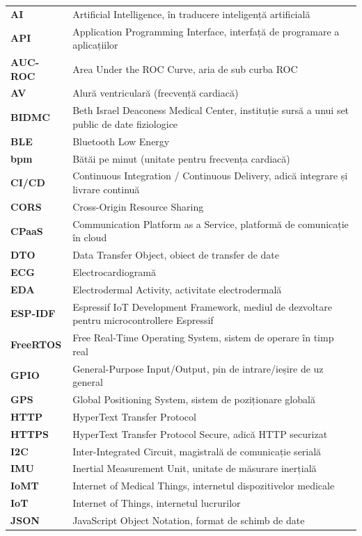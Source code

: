 \documentclass[12pt,a4paper]{article}
\begin{document}
{\small
\renewcommand{\arraystretch}{1.25}
\begin{longtable}{@{}>{\bfseries}p{2.7cm}p{10.6cm}@{}}
AI & Artificial Intelligence, în traducere inteligență artificială\\
API & Application Programming Interface, interfață de programare a aplicațiilor\\
AUC-ROC & Area Under the ROC Curve, aria de sub curba ROC\\
AV & Alură ventriculară (frecvență cardiacă)\\
BIDMC & Beth Israel Deaconess Medical Center, instituție sursă a unui set public de date fiziologice\\
BLE & Bluetooth Low Energy\\
bpm & Bătăi pe minut (unitate pentru frecvența cardiacă)\\
CI/CD & Continuous Integration / Continuous Delivery, adică integrare și livrare continuă\\
CORS & Cross-Origin Resource Sharing\\
CPaaS & Communication Platform as a Service, platformă de comunicație în cloud\\
DTO & Data Transfer Object, obiect de transfer de date\\
ECG & Electrocardiogramă\\
EDA & Electrodermal Activity, activitate electrodermală\\
ESP-IDF & Espressif IoT Development Framework, mediul de dezvoltare pentru microcontrollere Espressif\\
FreeRTOS & Free Real-Time Operating System, sistem de operare în timp real\\
GPIO & General-Purpose Input/Output, pin de intrare/ieșire de uz general\\
GPS & Global Positioning System, sistem de poziționare globală\\
HTTP & HyperText Transfer Protocol\\
HTTPS & HyperText Transfer Protocol Secure, adică HTTP securizat\\
I2C & Inter-Integrated Circuit, magistrală de comunicație serială\\
IMU & Inertial Measurement Unit, unitate de măsurare inerțială\\
IoMT & Internet of Medical Things, internetul dispozitivelor medicale\\
IoT & Internet of Things, internetul lucrurilor\\
JSON & JavaScript Object Notation, format de schimb de date\\

\end{longtable}}
\end{document}

